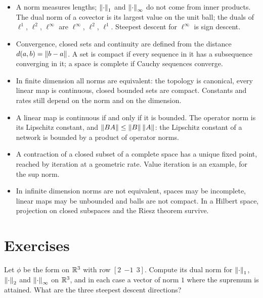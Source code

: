 \begin{notechapter}
\begin{chaptersummary}
\begin{itemize}[nosep]
  \item A norm measures lengths; $\left\|\cdot\right\|_1$ and $\left\|\cdot\right\|_\infty$ do
        not come from inner products. The dual norm of a covector is its
        largest value on the unit ball; the duals of $\ell^1$,
        $\ell^2$, $\ell^\infty$ are $\ell^\infty$, $\ell^2$, $\ell^1$.
        Steepest descent for $\ell^\infty$ is sign descent.
  \item Convergence, closed sets and continuity are defined from the
        distance $d(a, b) = \left\|b - a\right\|$. A set is compact if every
        sequence in it has a subsequence converging in it; a space is
        complete if Cauchy sequences converge.
  \item In finite dimension all norms are equivalent: the topology is
        canonical, every linear map is continuous, closed bounded sets are
        compact. Constants and rates still depend on the norm and on the
        dimension.
  \item A linear map is continuous if and only if it is bounded. The
        operator norm is its Lipschitz constant, and
        $\left\|BA\right\|\leq\left\|B\right\|\left\|A\right\|$: the Lipschitz constant of a network
        is bounded by a product of operator norms.
  \item A contraction of a closed subset of a complete space has a unique
        fixed point, reached by iteration at a geometric rate. Value
        iteration is an example, for the sup norm.
  \item In infinite dimension norms are not equivalent, spaces may be
        incomplete, linear maps may be unbounded and balls are not
        compact. In a Hilbert space, projection on closed subspaces and
        the Riesz theorem survive.
\end{itemize}
\end{chaptersummary}

\section*{Exercises}

\begin{exercise}\label{norms-banach:exr:1}
Let $\phi$ be the form on $\mathbb{R}^3$ with row $[2\ \ {-1}\ \ 3]$. Compute its
dual norm for $\left\|\cdot\right\|_1$, $\left\|\cdot\right\|_2$ and $\left\|\cdot\right\|_\infty$ on
$\mathbb{R}^3$, and in each case a vector of norm $1$ where the supremum is
attained. What are the three steepest descent directions?
\end{exercise}


\end{notechapter}
